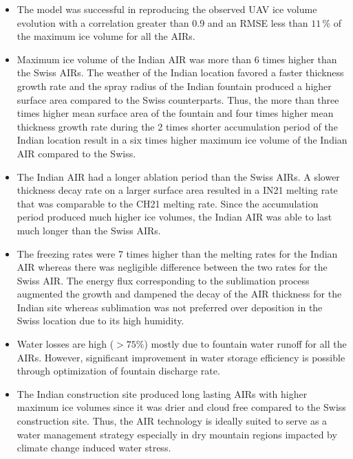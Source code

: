 \documentclass[utf8]{frontiersSCNS}
\begin{document}
\begin{itemize}
	\item The model was successful in reproducing the observed UAV ice volume evolution with a correlation greater
	      than 0.9 and an RMSE less than $11 \, \%$ of the maximum ice volume for all the AIRs.

	\item Maximum ice volume of the Indian AIR was more than 6 times higher than the Swiss AIRs. The weather of the
	      Indian location favored a faster thickness growth rate and the spray radius of the Indian fountain produced a
	      higher surface area compared to the Swiss counterparts. Thus, the more than three times higher mean surface
	      area of the fountain and four times higher mean thickness growth rate during the 2 times shorter accumulation
	      period of the Indian location result in a six times higher maximum ice volume of the Indian AIR compared to
	      the Swiss.

	\item The Indian AIR had a longer ablation period than the Swiss AIRs. A slower thickness decay rate on a larger
	      surface area resulted in a IN21 melting rate that was comparable to the CH21 melting rate. Since the
	      accumulation period produced much higher ice volumes, the Indian AIR was able to last much longer than the
	      Swiss AIRs.

	\item The freezing rates were 7 times higher than the melting rates for the Indian AIR whereas there was
	      negligible difference between the two rates for the Swiss AIR. The energy flux corresponding to the sublimation
	      process augmented the growth and dampened the decay of the AIR thickness for the Indian site whereas
	      sublimation was not preferred over deposition in the Swiss location due to its high humidity.

	\item Water losses are high ($>75\%$) mostly due to fountain water runoff for all the AIRs. However, significant
	      improvement in water storage efficiency is possible through optimization of fountain discharge rate.

	\item The Indian construction site produced long lasting AIRs with higher maximum ice volumes since it was drier
	      and cloud free compared to the Swiss construction site. Thus, the AIR technology is ideally suited to serve as
	      a water management strategy especially in dry mountain regions impacted by climate change induced water
	      stress.

\end{itemize}
\end{document}
